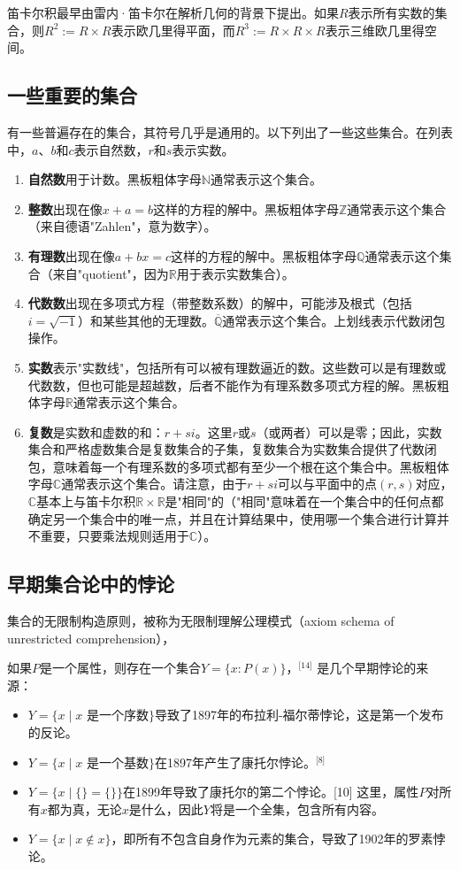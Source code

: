 笛卡尔积最早由雷内·笛卡尔在解析几何的背景下提出。如果$R$表示所有实数的集合，则$R^2 := R \times R$表示欧几里得平面，而$R^3 := R \times R \times R$表示三维欧几里得空间。
\subsection{一些重要的集合}  
有一些普遍存在的集合，其符号几乎是通用的。以下列出了一些这些集合。在列表中，$a$、$b$和$c$表示自然数，$r$和$s$表示实数。
\begin{enumerate}
\item \textbf{自然数}用于计数。黑板粗体字母$ \mathbb{N} $通常表示这个集合。
\item \textbf{整数}出现在像$x + a = b$这样的方程的解中。黑板粗体字母$ \mathbb{Z} $通常表示这个集合（来自德语"Zahlen"，意为数字）。
\item \textbf{有理数}出现在像$a + bx = c$这样的方程的解中。黑板粗体字母$ \mathbb{Q} $通常表示这个集合（来自"quotient"，因为$ \mathbb{R} $用于表示实数集合）。
\item \textbf{代数数}出现在多项式方程（带整数系数）的解中，可能涉及根式（包括$i = \sqrt{-1}$）和某些其他的无理数。$ \overline{\mathbb{Q}} $通常表示这个集合。上划线表示代数闭包操作。
\item \textbf{实数}表示"实数线"，包括所有可以被有理数逼近的数。这些数可以是有理数或代数数，但也可能是超越数，后者不能作为有理系数多项式方程的解。黑板粗体字母$ \mathbb{R} $通常表示这个集合。
\item \textbf{复数}是实数和虚数的和：$r + si$。这里$r$或$s$（或两者）可以是零；因此，实数集合和严格虚数集合是复数集合的子集，复数集合为实数集合提供了代数闭包，意味着每一个有理系数的多项式都有至少一个根在这个集合中。黑板粗体字母$ \mathbb{C} $通常表示这个集合。请注意，由于$ r + si $可以与平面中的点$(r, s)$对应，$ \mathbb{C} $基本上与笛卡尔积$ \mathbb{R} \times \mathbb{R} $是"相同"的（"相同"意味着在一个集合中的任何点都确定另一个集合中的唯一点，并且在计算结果中，使用哪一个集合进行计算并不重要，只要乘法规则适用于$ \mathbb{C} $）。
\end{enumerate}
\subsection{早期集合论中的悖论}  
集合的无限制构造原则，被称为无限制理解公理模式（axiom schema of unrestricted comprehension），

如果$P$是一个属性，则存在一个集合$Y = \{x : P(x)\}$，\(^\text{[14]}\)  
是几个早期悖论的来源：
\begin{itemize}
\item $Y = \{x \mid x \text{ 是一个序数}\}$导致了1897年的布拉利-福尔蒂悖论，这是第一个发布的反论。
\item $Y = \{x \mid x \text{ 是一个基数}\}$在1897年产生了康托尔悖论。\(^\text{[8]}\)
\item $Y = \{x \mid \{\} = \{\}\}$在1899年导致了康托尔的第二个悖论。[10] 这里，属性$P$对所有$x$都为真，无论$x$是什么，因此$Y$将是一个全集，包含所有内容。
\item $Y = \{x \mid x \notin x\}$，即所有不包含自身作为元素的集合，导致了1902年的罗素悖论。
\end{itemize}

